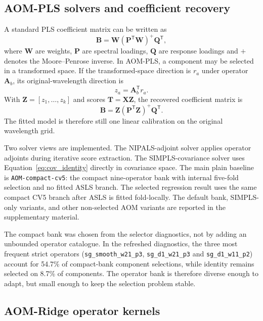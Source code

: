 \documentclass[11pt,a4paper]{article}
\newcommand{\X}{\mathbf{X}}
\newcommand{\A}{\mathbf{A}}
\newcommand{\B}{\mathbf{B}}
\newcommand{\Z}{\mathbf{Z}}
\newcommand{\T}{\mathbf{T}}
\newcommand{\transpose}{^{\mathsf T}}
\begin{document}
\subsection{AOM-PLS solvers and coefficient recovery}

A standard PLS coefficient matrix can be written as
\begin{equation}
  \B=\mathbf W(\mathbf P\transpose\mathbf W)^+\mathbf Q\transpose ,
\end{equation}
where $\mathbf W$ are weights, $\mathbf P$ are spectral loadings,
$\mathbf Q$ are response loadings and $+$ denotes the Moore--Penrose inverse.
In AOM-PLS, a component may be selected in a transformed space.  If the
transformed-space direction is $r_a$ under operator $\A_b$, its
original-wavelength direction is
\begin{equation}
  z_a=\A_b\transpose r_a .
\end{equation}
With $\Z=[z_1,\ldots,z_k]$ and scores $\T=\X\Z$, the recovered coefficient
matrix is
\begin{equation}
  \B=\Z(\mathbf P\transpose\Z)^+\mathbf Q\transpose .
  \label{eq:aompls_coef}
\end{equation}
The fitted model is therefore still one linear calibration on the original
wavelength grid.

Two solver views are implemented.  The NIPALS-adjoint solver applies operator
adjoints during iterative score extraction.  The SIMPLS-covariance solver
uses Equation~\ref{eq:cov_identity} directly in covariance space.  The main
plain baseline is \texttt{AOM-compact-cv5}: the compact nine-operator bank
with internal five-fold selection and no fitted ASLS branch.  The selected
regression result uses the same compact CV5 branch after ASLS is fitted
fold-locally.  The default bank, SIMPLS-only variants, and other non-selected
AOM variants are reported in the supplementary material.

The compact bank was chosen from the selector diagnostics, not by adding an
unbounded operator catalogue.  In the refreshed diagnostics, the three most
frequent strict operators
(\texttt{sg\_smooth\_w21\_p3}, \texttt{sg\_d1\_w21\_p3} and
\texttt{sg\_d1\_w11\_p2}) account for 54.7\% of compact-bank component
selections, while identity remains selected on 8.7\% of components.  The
operator bank is therefore diverse enough to adapt, but small enough to keep
the selection problem stable.

\subsection{AOM-Ridge operator kernels}
\end{document}
